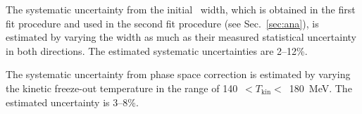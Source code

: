 The systematic uncertainty from the initial \fzero~width, which is obtained in the first fit procedure and used in the second fit procedure (see Sec.~\ref{sec:ana}), is estimated by varying the width as much as their measured statistical uncertainty in both directions. The estimated systematic uncertainties are 2--12\%.

The systematic uncertainty from phase space correction is estimated by varying the kinetic freeze-out temperature in the range of 140~$<T_{\mathrm{kin}}<$~180~MeV. The estimated uncertainty is 3--8\%. 

